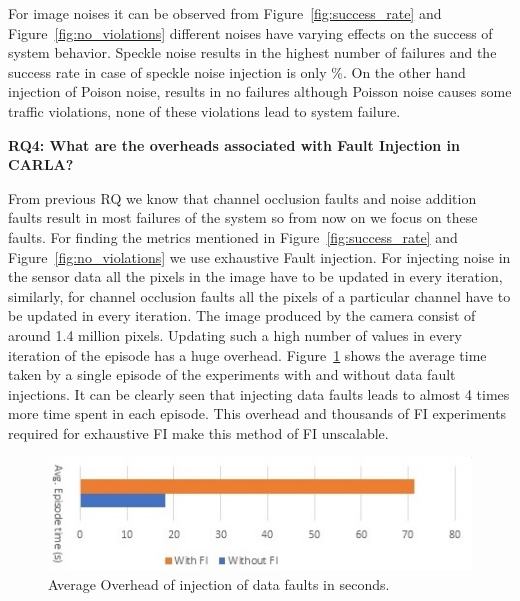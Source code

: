 For image noises it can be observed from Figure~\ref{fig:success_rate} and Figure~\ref{fig:no_violations} different noises have varying effects on the success of system behavior. Speckle noise results in the highest number of failures and the success rate in case of speckle noise injection is only \%. On the other hand injection of Poison noise, results in no failures although Poisson noise causes some traffic violations, none of these violations lead to system failure.

\textbf{RQ4: What are the overheads associated with Fault Injection in CARLA?}

From previous RQ we know that channel occlusion faults and noise addition faults result in most failures of the system so from now on we focus on these faults. For finding the metrics mentioned in Figure~\ref{fig:success_rate} and Figure~\ref{fig:no_violations} we use exhaustive Fault injection. For injecting noise in the sensor data all the pixels in the image have to be updated in every iteration, similarly, for channel occlusion faults all the pixels of a particular channel have to be updated in every iteration. The image produced by the camera consist of around 1.4 million pixels. Updating such a high number of values in every iteration of the episode has a huge overhead. Figure~\ref{fig:overhead} shows the average time taken by a single episode of the experiments with and without data fault injections. It can be clearly seen that injecting data faults leads to almost 4 times more time spent in each episode. This overhead and thousands of FI experiments required for exhaustive FI make this method of FI unscalable. 

\begin{figure}  
	\vspace{1.0em}
	\centering
	\includegraphics[scale=0.7]{overhead}
	\vspace{-0.5em}
	\caption{Average Overhead of injection of data faults in seconds.}
	\label{fig:overhead}
	\vspace{-1.5em}
\end{figure}

